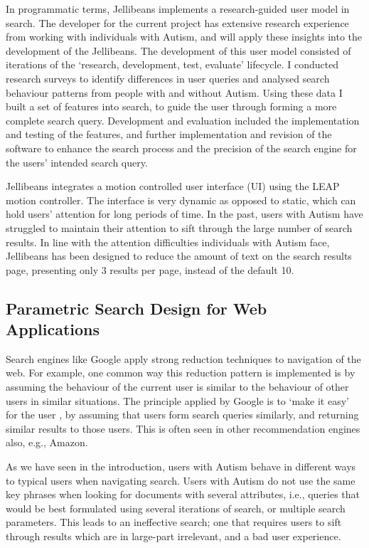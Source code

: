 \documentclass[a4paper, 11pt]{article}
\begin{document}
\vspace{5mm}
In programmatic terms, Jellibeans implements a research-guided user model in search. The developer for the current project has extensive research experience from working with individuals with Autism, and will apply these insights into the development of the Jellibeans. The development of this user model consisted of iterations of the `research, development, test, evaluate' lifecycle. I conducted research surveys to identify differences in user queries and analysed search behaviour patterns from people with and without Autism. Using these data I built a set of features into search, to guide the user through forming a more complete search query. Development and evaluation included the implementation and testing of the features, and further implementation and revision of the software to enhance the search process and the precision of the search engine for the users' intended search query. 

\vspace{5mm}
Jellibeans integrates a motion controlled user interface (UI) using the LEAP motion controller. The interface is very dynamic as opposed to static, which can hold users' attention for long periods of time. In the past, users with Autism have struggled to maintain their attention to sift through the large number of search results. In line with the attention difficulties individuals with Autism face, Jellibeans has been designed to reduce the amount of text on the search results page, presenting only 3 results per page, instead of the default 10. 

\subsection{Parametric Search Design for Web Applications}

Search engines like Google apply strong reduction techniques to navigation of the web. For example, one common way this reduction pattern is implemented is by assuming the behaviour of the current user is similar to the behaviour of other users in similar situations. The principle applied by Google is to `make it easy' for the user \cite{googleTerms}, by assuming that users form search queries similarly, and returning similar results to those users. This is often seen in other recommendation engines also, e.g., Amazon. 

\vspace{5mm}
As we have seen in the introduction, users with Autism behave in different ways to typical users when navigating search. Users with Autism do not use the same key phrases when looking for documents with several attributes, i.e., queries that would be best formulated using several iterations of search, or multiple search parameters. This leads to an ineffective search; one that requires users to sift through results which are in large-part irrelevant, and a bad user experience.  
\end{document}
